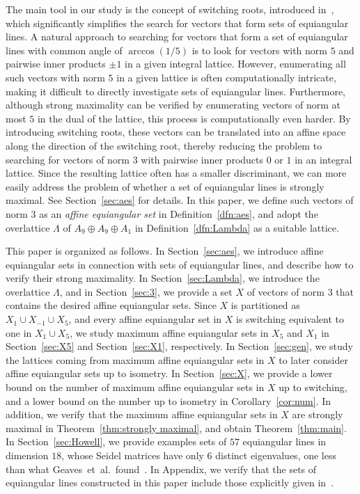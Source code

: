 \documentclass[reqno, 11pt]{amsart}
\numberwithin{equation}{section}
\theoremstyle{definition}
\begin{document}
The main tool in our study is the concept of switching roots, introduced in~\cite{cao2021}, which significantly simplifies the search for vectors that form sets of equiangular lines.
A natural approach to searching for vectors that form a set of equiangular lines with common angle of $\arccos(1/5)$ is to look for vectors with norm $5$ and pairwise inner products $\pm 1$ in a given integral lattice.
However, enumerating all such vectors with norm $5$ in a given lattice is often computationally intricate, making it difficult to directly investigate sets of equiangular lines.
Furthermore, although strong maximality can be verified by enumerating vectors of norm at most $5$ in the dual of the lattice, this process is computationally even harder.
By introducing switching roots, these vectors can be translated into an affine space along the direction of the switching root, thereby reducing the problem to searching for vectors of norm $3$ with pairwise inner products $0$ or $1$ in an integral lattice.
Since the resulting lattice often has a smaller discriminant, we can more easily address the problem of whether a set of equiangular lines is strongly maximal.
See Section~\ref{sec:aes} for details.
In this paper, we define such vectors of norm $3$ as an \emph{affine equiangular set} in Definition~\ref{dfn:aes}, and adopt the overlattice $\Lambda$ of $A_9 \oplus A_9 \oplus A_1$ in Definition~\ref{dfn:Lambda} as a suitable lattice.

This paper is organized as follows.
In Section~\ref{sec:aes}, we introduce affine equiangular sets in connection with sets of equiangular lines, and describe how to verify their strong maximality.
In Section~\ref{sec:Lambda}, we introduce the overlattice $\Lambda$, and in Section~\ref{sec:3}, we provide a set $X$ of vectors of norm $3$ that contains the desired affine equiangular sets.
Since $X$ is partitioned as $X_1 \cup X_{-1} \cup X_5$, and every affine equiangular set in $X$ is switching equivalent to one in $X_1 \cup X_5$,
we study maximum affine equiangular sets in $X_5$ and $X_1$ in Section~\ref{sec:X5} and Section~\ref{sec:X1}, respectively.
In Section~\ref{sec:gen}, we study the lattices coming from maximum affine equiangular sets in $X$ to later consider affine equiangular sets up to isometry.
In Section~\ref{sec:X}, we provide a lower bound on the number of maximum affine equiangular sets in $X$ up to switching, and a lower bound on the number up to isometry in Corollary~\ref{cor:num}.
In addition, we verify that the maximum affine equiangular sets in $X$ are strongly maximal in Theorem~\ref{thm:strongly maximal}, and obtain Theorem~\ref{thm:main}.
In Section~\ref{sec:Howell}, we provide examples sets of $57$ equiangular lines in dimension $18$, whose Seidel matrices have only $6$ distinct eigenvalues, one less than what Geaves~et~al.\ found~\cite{Greaves2023}. 
In Appendix, %
we verify that the sets of equiangular lines constructed in this paper include those explicitly given in~\cite{Greaves2023}.
\end{document}
